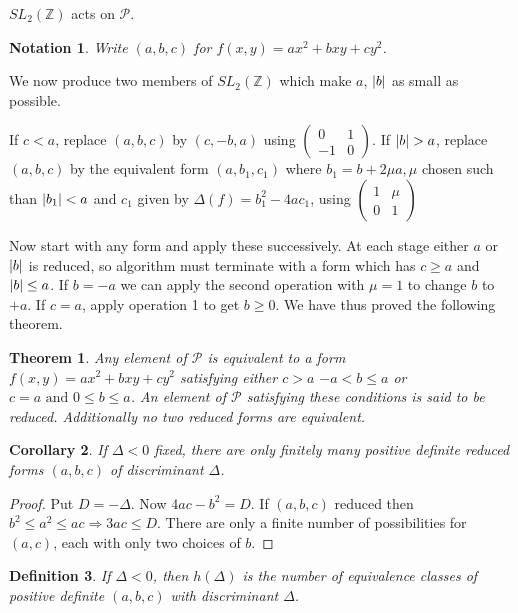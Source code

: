\documentclass{notes}
\theoremstyle{plain}
\newtheorem{theorem}{Theorem}[chapter]
\newtheorem{corollary}[theorem]{Corollary}
\newtheorem{definition}[theorem]{Definition}
\newtheorem*{notation}{Notation}
\begin{document}
$SL_2(\mathbb{Z})$ acts on $\mathcal{P}$.

\begin{notation}
  Write $(a,b,c)$ for $f(x,y) = ax^2+bxy+cy^2$.
\end{notation}

We now produce two members of $SL_2(\mathbb{Z})$ which make $a$,
$\left|b\right|$ as small as possible.

If $c < a$, replace $(a,b,c)$ by $(c,-b,a)$ using $\left(
\begin{smallmatrix}
  0       & 1 \\
  -1 & 0
\end{smallmatrix}
\right)$.  If $\left|b\right| > a$, replace $(a,b,c)$ by the equivalent form
$(a, b_1, c_1)$ where $b_1 = b+2\mu a, \mu$ chosen such than
$\left|b_1\right|<a$ and $c_1$ given by $\Delta(f)=b_1^2-4ac_1$, using
$\left(
\begin{smallmatrix}
  1       & \mu \\
  0 & 1
\end{smallmatrix}
\right)$

Now start with any form and apply these successively.  At each stage
either $a$ or $\left|b\right|$ is reduced, so algorithm must terminate with a
form which has $c \ge a$ and $\left|b\right| \le a$.  If $b=-a$ we can apply
the second operation with $\mu = 1$ to change $b$ to $+a$.  If $c=a$,
apply operation 1 to get $b \ge 0$.  We have thus proved the following
theorem.

\begin{theorem}
  Any element of $\mathcal{P}$ is equivalent to a form
  $f(x,y)=ax^2+bxy+cy^2$ satisfying either $c > a$  $-a <
  b \le a$ or $c=a \text{ and } 0 \le b \le a$.  An element of
  $\mathcal{P}$ satisfying these conditions is said to be reduced.
  Additionally no two reduced forms are equivalent.
\end{theorem}

\begin{corollary}
  If $\Delta < 0$ fixed, there are only finitely many positive
  definite reduced forms $(a,b,c)$ of discriminant $\Delta$.
\end{corollary}

\begin{proof}
  Put $D=-\Delta$.  Now $4ac-b^2=D$.  If $(a,b,c)$ reduced then $b^2
  \le a^2 \le ac \Rightarrow 3ac \le D$.  There are only a finite
  number of possibilities for $(a,c)$, each with only two choices of
  $b$.
\end{proof}

\begin{definition}
  If $\Delta < 0$, then $h(\Delta)$ is the number of equivalence
  classes of positive definite $(a,b,c)$ with discriminant $\Delta$.
\end{definition}
\end{document}
